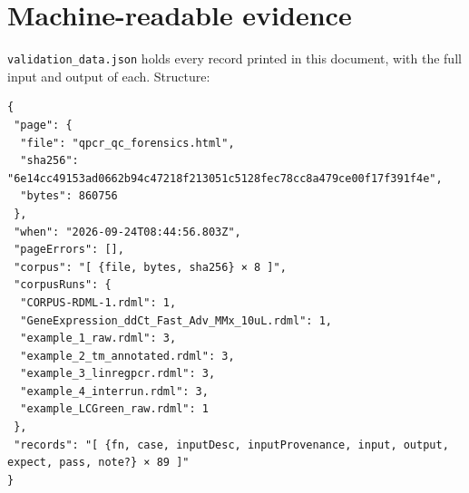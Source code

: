 \chapter{Machine-readable evidence}

\texttt{validation\_data.json} holds every record printed in this document, with the full input and
output of each. Structure:

\begin{lstlisting}[style=jstiny]
{
 "page": {
  "file": "qpcr_qc_forensics.html",
  "sha256": "6e14cc49153ad0662b94c47218f213051c5128fec78cc8a479ce00f17f391f4e",
  "bytes": 860756
 },
 "when": "2026-09-24T08:44:56.803Z",
 "pageErrors": [],
 "corpus": "[ {file, bytes, sha256} × 8 ]",
 "corpusRuns": {
  "CORPUS-RDML-1.rdml": 1,
  "GeneExpression_ddCt_Fast_Adv_MMx_10uL.rdml": 1,
  "example_1_raw.rdml": 3,
  "example_2_tm_annotated.rdml": 3,
  "example_3_linregpcr.rdml": 3,
  "example_4_interrun.rdml": 3,
  "example_LCGreen_raw.rdml": 1
 },
 "records": "[ {fn, case, inputDesc, inputProvenance, input, output, expect, pass, note?} × 89 ]"
}
\end{lstlisting}
